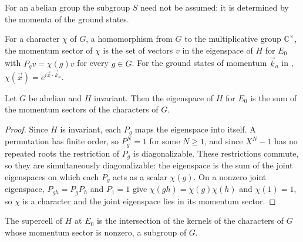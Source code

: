 For an abelian group the subgroup $S$ need not be assumed: it is determined
by the momenta of the ground states.

\begin{definition}
    \label{def:hastings_momentum_sector}
    \leanok
    For a character $\chi$ of $G$, a homomorphism from $G$ to the multiplicative
    group $\mathbb{C}^\times$, the
    momentum sector of $\chi$ is the set of vectors $v$ in the eigenspace of $H$
    for $E_0$ with $P_gv=\chi(g)v$ for every $g\in G$. For the ground states of
    momentum $\vec k_a$ in \cite[lines 1613--1618]{Hastings2006Solving},
    $\chi(\vec x)=e^{i\vec x\cdot\vec k_a}$.
\end{definition}

\begin{lemma}
    \label{thm:hastings_momentum_sectors_span}
    \leanok
    Let $G$ be abelian and $H$ invariant. Then the eigenspace of $H$ for $E_0$ is
    the sum of the momentum sectors of the characters of $G$.
\end{lemma}
\begin{proof}\leanok
    Since $H$ is invariant, each $P_g$ maps the eigenspace into itself. A
    permutation has finite order, so $P_g^N=1$ for some $N\ge1$, and since
    $X^N-1$ has no repeated roots the restriction of $P_g$ is diagonalizable.
    These restrictions commute, so they are simultaneously diagonalizable: the
    eigenspace is the sum of the joint eigenspaces on which each $P_g$ acts as
    a scalar $\chi(g)$. On a nonzero joint eigenspace,
    $P_{gh}=P_gP_h$ and $P_1=1$ give $\chi(gh)=\chi(g)\chi(h)$ and $\chi(1)=1$,
    so $\chi$ is a character and the joint eigenspace lies in its momentum
    sector.
\end{proof}

\begin{definition}
    \label{def:hastings_supercell_of_momenta}
    \leanok
    The supercell of $H$ at $E_0$ is the intersection of the kernels of the
    characters of $G$ whose momentum sector is nonzero, a subgroup of $G$.
\end{definition}


